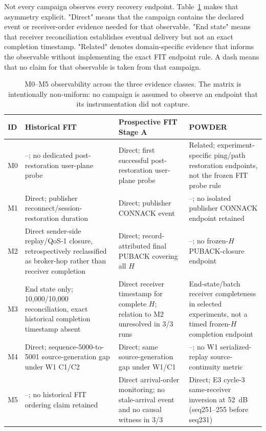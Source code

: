 \documentclass[journal]{IEEEtran}
\begin{document}
Not every campaign observes every recovery endpoint. Table~\ref{tab:coverage} makes that asymmetry explicit. "Direct" means that the campaign contains the declared event or receiver-order evidence needed for that observable. "End state" means that receiver reconciliation establishes eventual delivery but not an exact completion timestamp. "Related" denotes domain-specific evidence that informs the observable without implementing the exact FIT endpoint rule. A dash means that no claim for that observable is taken from that campaign.

\begin{table}[t]
\centering
\small
\caption{M0--M5 observability across the three evidence classes. The matrix is intentionally non-uniform: no campaign is assumed to observe an endpoint that its instrumentation did not capture.}
\label{tab:coverage}
\begin{tabular}{@{}p{}p{}p{}p{}@{}}
\toprule
\textbf{ID} & \textbf{Historical FIT} & \textbf{Prospective FIT Stage A} & \textbf{POWDER} \\
\midrule
M0 & --; no dedicated post-restoration user-plane probe & Direct; first successful post-restoration user-plane probe & Related; experiment-specific ping/path restoration endpoints, not the frozen FIT probe rule \\
M1 & Direct; publisher reconnect/session-restoration duration & Direct; publisher CONNACK event & --; no isolated publisher CONNACK endpoint retained \\
M2 & Direct sender-side replay/QoS-1 closure, retrospectively reclassified as broker-hop rather than receiver completion & Direct; record-attributed final PUBACK covering all $H$ & --; no frozen-$H$ PUBACK-closure endpoint \\
M3 & End state only; 10,000/10,000 reconciliation, exact historical completion timestamp absent & Direct receiver timestamp for complete $H$; relation to M2 unresolved in 3/3 runs & End-state/batch receiver completeness in selected experiments, not a timed frozen-$H$ completion endpoint \\
M4 & Direct; sequence-5000-to-5001 source-generation gap under W1 C1/C2 & Direct; same source-generation gap under W1/C1 & --; no W1 serialized-replay source-continuity metric \\
M5 & --; no historical FIT ordering claim retained & Direct arrival-order monitoring; no stale-arrival event and no causal witness in 3/3 & Direct; E3 cycle-3 same-receiver inversion at 52~dB (seq251--255 before seq231) \\
\bottomrule
\end{tabular}
\end{table}
\end{document}
